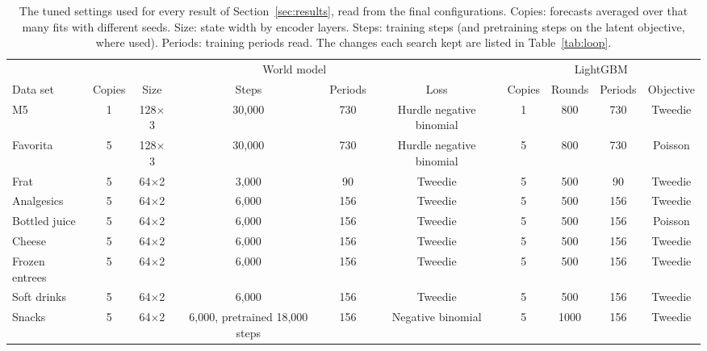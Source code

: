 \begin{table}[t]
\centering\footnotesize\setlength{\tabcolsep}{4pt}
\caption{The tuned settings used for every result of Section~\ref{sec:results}, read from the final configurations.
Copies: forecasts averaged over that many fits with different seeds. Size: state width by encoder layers. Steps:
training steps (and pretraining steps on the latent objective, where used). Periods: training periods read. The
changes each search kept are listed in Table~\ref{tab:loop}.}
\label{tab:final-settings}
\begin{tabular}{l ccccc cccc}
\toprule
 & \multicolumn{5}{c}{World model} & \multicolumn{4}{c}{LightGBM}\\
\cmidrule(lr){2-6}\cmidrule(lr){7-10}
Data set & Copies & Size & Steps & Periods & Loss & Copies & Rounds & Periods & Objective\\
\midrule
M5 & 1 & 128$\times$3 & 30,000 & 730 & Hurdle negative binomial & 1 & 800 & 730 & Tweedie \\
Favorita & 5 & 128$\times$3 & 30,000 & 730 & Hurdle negative binomial & 5 & 800 & 730 & Poisson \\
Frat & 5 & 64$\times$2 & 3,000 & 90 & Tweedie & 5 & 500 & 90 & Tweedie \\
Analgesics & 5 & 64$\times$2 & 6,000 & 156 & Tweedie & 5 & 500 & 156 & Tweedie \\
Bottled juice & 5 & 64$\times$2 & 6,000 & 156 & Tweedie & 5 & 500 & 156 & Poisson \\
Cheese & 5 & 64$\times$2 & 6,000 & 156 & Tweedie & 5 & 500 & 156 & Tweedie \\
Frozen entrees & 5 & 64$\times$2 & 6,000 & 156 & Tweedie & 5 & 500 & 156 & Tweedie \\
Soft drinks & 5 & 64$\times$2 & 6,000 & 156 & Tweedie & 5 & 500 & 156 & Tweedie \\
Snacks & 5 & 64$\times$2 & 6,000, pretrained 18,000 steps & 156 & Negative binomial & 5 & 1000 & 156 & Tweedie \\
\bottomrule
\end{tabular}
\end{table}
